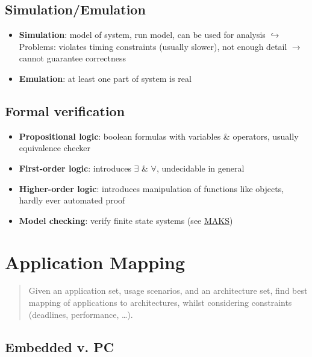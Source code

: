 \documentclass{article}
\begin{document}
\subsection{Simulation/Emulation}
\begin{itemize}
  \item \textbf{Simulation}: model of system, run model, can be used for analysis
        $\hookrightarrow$ Problems: violates timing constraints (usually slower), not enough detail $\to$ cannot guarantee correctness
  \item \textbf{Emulation}: at least one part of system is real
\end{itemize}

\subsection{Formal verification}
\begin{itemize}
  \item \textbf{Propositional logic}: boolean formulas with variables \& operators, usually equivalence checker
  \item \textbf{First-order logic}: introduces $\exists$ \& $\forall$, undecidable in general
  \item \textbf{Higher-order logic}: introduces manipulation of functions like objects, hardly ever automated proof
  \item \textbf{Model checking}: verify finite state systems (see \href{https://github.com/Leo-Lem/winter23/tree/main/MAKS}{MAKS})
\end{itemize}



\section{Application Mapping}
\begin{quote}Given an application set, usage scenarios, and an architecture set, find best mapping of applications to architectures, whilst considering constraints (deadlines, performance, …).\end{quote}

\subsection{Embedded v. PC}

\end{document}
